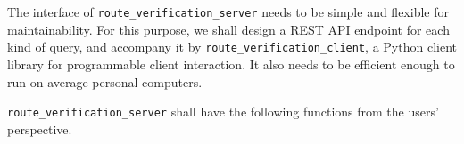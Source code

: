 \documentclass[12pt]{article}
\begin{document}
The interface of \verb|route_verification_server| needs to
be simple and flexible for maintainability.
For this purpose,
we shall design a REST API endpoint for each kind of query,
and accompany it by \verb|route_verification_client|,
a Python client library for programmable client interaction.
It also needs to be efficient enough to run on average personal computers.


\verb|route_verification_server| shall have the following functions from
the users' perspective.
\end{document}

